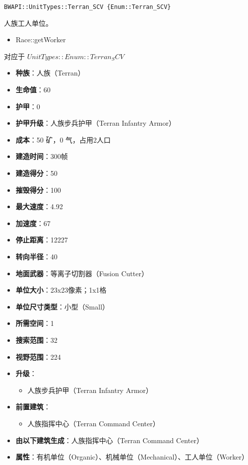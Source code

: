 \begin{tcolorbox}[colback=white, colframe=black!60!white, title=Terran\_SCV(), arc=0mm]
\begin{verbatim}
BWAPI::UnitTypes::Terran_SCV {Enum::Terran_SCV}
\end{verbatim}
人族工人单位。\par
\begin{refer}
    \begin{itemize}
        \item Race::getWorker 
    \end{itemize}
\end{refer}
对应于  $ UnitTypes::Enum::Terran_SCV $ 

\begin{itemize}
    \item \textbf{种族}：人族（Terran）
    \item \textbf{生命值}：60
    \item \textbf{护甲}：0
    \item \textbf{护甲升级}：人族步兵护甲（Terran Infantry Armor）
    \item \textbf{成本}：50 矿，0 气，占用2人口
    \item \textbf{建造时间}：300帧
    \item \textbf{建造得分}：50
    \item \textbf{摧毁得分}：100
    \item \textbf{最大速度}：4.92
    \item \textbf{加速度}：67
    \item \textbf{停止距离}：12227
    \item \textbf{转向半径}：40
    \item \textbf{地面武器}：等离子切割器（Fusion Cutter）
    \item \textbf{单位大小}：23x23像素；1x1格
    \item \textbf{单位尺寸类型}：小型（Small）
    \item \textbf{所需空间}：1
    \item \textbf{搜索范围}：32
    \item \textbf{视野范围}：224
    \item \textbf{升级}：
        \begin{itemize}
            \item 人族步兵护甲（Terran Infantry Armor）
        \end{itemize}
    \item \textbf{前置建筑}：
        \begin{itemize}
            \item 人族指挥中心（Terran Command Center）
        \end{itemize}
    \item \textbf{由以下建筑生成}：人族指挥中心（Terran Command Center）
    \item \textbf{属性}：有机单位（Organic）、机械单位（Mechanical）、工人单位（Worker）
\end{itemize}
\end{tcolorbox}

